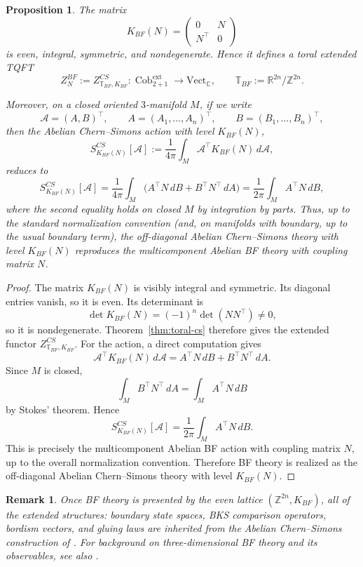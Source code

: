 \documentclass[12pt]{amsart}
\numberwithin{equation}{section}
\newtheorem{prop}[theorem]{Proposition}
\newtheorem*{remark}{Remark}
\theoremstyle{definition}
\DeclareMathOperator{\Cob}{Cob}
\begin{document}
\begin{prop}
\label{prop:bf-embedding}
The matrix
$$
K_{BF}(N)=
\begin{pmatrix}
0 & N\\
N^{\top} & 0
\end{pmatrix}
$$
is even, integral, symmetric, and nondegenerate. Hence it defines a toral extended TQFT
$$
Z^{BF}_N:=Z^{CS}_{\mathbb T_{BF},K_{BF}}:
\Cob^{\mathrm{ext}}_{2+1}\longrightarrow \mathrm{Vect}_{\mathbb C},
\qquad
\mathbb T_{BF}:=\mathbb R^{2n}/\mathbb Z^{2n}.
$$

Moreover, on a closed oriented $3$-manifold $M$, if we write
$$
\mathcal A=(A,B)^{\top},
\qquad
A=(A_1,\dots,A_n)^{\top},
\qquad
B=(B_1,\dots,B_n)^{\top},
$$
then the Abelian Chern--Simons action with level $K_{BF}(N)$,
$$
S^{CS}_{K_{BF}(N)}[\mathcal A]
:=
\frac{1}{4\pi}\int_M \mathcal A^{\top}K_{BF}(N)\,d\mathcal A,
$$
reduces to
$$
S^{CS}_{K_{BF}(N)}[\mathcal A]
=
\frac{1}{4\pi}\int_M
\bigl(
A^{\top}N\,dB + B^{\top}N^{\top}\,dA
\bigr)
=
\frac{1}{2\pi}\int_M A^{\top}N\,dB,
$$
where the second equality holds on closed $M$ by integration by parts. Thus, up to the standard normalization convention (and, on manifolds with boundary, up to the usual boundary term), the off-diagonal Abelian Chern--Simons theory with level $K_{BF}(N)$ reproduces the multicomponent Abelian BF theory with coupling matrix $N$.
\end{prop}

\begin{proof}
The matrix $K_{BF}(N)$ is visibly integral and symmetric. Its diagonal entries vanish, so it is even. Its determinant is
$$
\det K_{BF}(N)=(-1)^n\det(NN^{\top})\neq 0,
$$
so it is nondegenerate. Theorem~\ref{thm:toral-cs} therefore gives the extended functor $Z^{CS}_{\mathbb T_{BF},K_{BF}}.$ For the action, a direct computation gives
$$
\mathcal A^{\top}K_{BF}(N)\,d\mathcal A
=
A^{\top}N\,dB + B^{\top}N^{\top}\,dA.
$$
Since $M$ is closed,
$$
\int_M B^{\top}N^{\top}\,dA
=
\int_M A^{\top}N\,dB
$$
by Stokes' theorem. Hence
$$
S^{CS}_{K_{BF}(N)}[\mathcal A]
=
\frac{1}{2\pi}\int_M A^{\top}N\,dB.
$$
This is precisely the multicomponent Abelian BF action with coupling matrix $N$, up to
the overall normalization convention. Therefore BF theory is realized as the off-diagonal
Abelian Chern--Simons theory with level $K_{BF}(N)$.
\end{proof}

\begin{remark}
Once BF theory is presented by the even lattice $(\mathbb Z^{2n},K_{BF})$, all of the extended structures: boundary state spaces, BKS comparison operators, bordism vectors, and gluing laws are inherited from the Abelian Chern--Simons construction of \cite{Galviz2}. For background on three-dimensional BF theory and its observables, see also \cite{CCRFM95}.
\end{remark}
\end{document}
